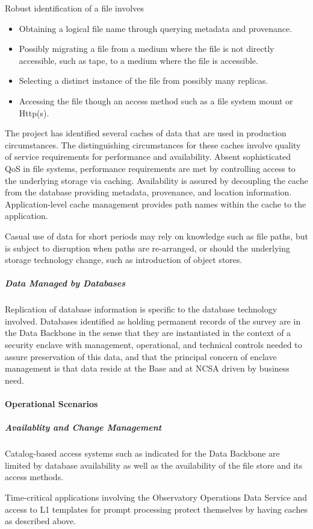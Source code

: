 Robust identification of a file involves
\begin{itemize}
\item Obtaining a logical file name through querying metadata and provenance.
\item Possibly migrating a file from a medium where the file is not directly accessible,
such as tape, to a medium where the file is accessible.
\item Selecting a distinct instance of the file from possibly many replicas.
\item Accessing the file though an access method such as a file system mount or Http(s). 
\end{itemize}

The project has identified several caches of data that are used in production circumstances.
The distinguishing circumstances for these caches involve quality of service requirements for
performance and availability. Absent sophisticated QoS in file systems, performance requirements
are met by controlling access to the underlying storage via caching. Availability is assured by
decoupling the cache from the database providing metadata, provenance, and location information.
Application-level cache management provides path names within the cache to the application.

Casual use of data for short periods may rely on knowledge such as file paths, but is subject
to disruption when paths are re-arranged, or should the underlying storage technology change, 
such as introduction of object stores.

\subparagraph{Data Managed by Databases}

Replication of database information is specific to the database technology involved.
Databases identified as holding permanent records of the survey are in the Data Backbone 
in the sense that they are instantiated in the context of a security enclave with management, 
operational, and technical controls needed to assure preservation of this data, and that the 
principal concern of enclave management is that data reside at the Base and at NCSA 
driven by business need.

\paragraph{Operational Scenarios}

\subparagraph{Availablity and Change Management}

Catalog-based access systems such as indicated for the Data Backbone are
limited by database availability as well as the availability of the file
store and its access methods.

Time-critical applications involving the Observatory Operations Data Service and access 
to L1 templates for prompt processing protect themselves by having caches as described above.